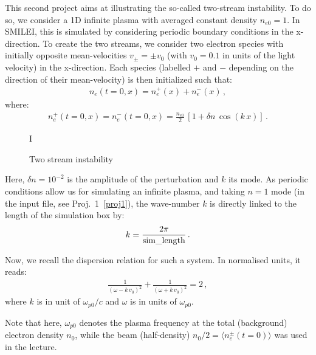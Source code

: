 \documentclass[11pt,a4paper]{article}
\begin{document}
This second project aims at illustrating the so-called two-stream instability.
To do so, we consider a 1D infinite plasma with averaged constant density $n_{e0} = 1$. 
In SMILEI, this is simulated by considering periodic boundary conditions in the x-direction. 
To create the two streams, we consider two electron species with initially opposite mean-velocities $v_{\pm} = \pm v_0$ (with $v_0 = 0.1$ in units of the light velocity) in the x-direction.
Each species (labelled $+$ and $-$ depending on the direction of their mean-velocity) is then initialized such that:
\begin{eqnarray*}
n_e(t=0,x) = n_e^+(x) + n_e^-(x)\,,
\end{eqnarray*}
where:
\begin{eqnarray*}
n_e^+(t=0,x) = n_e^-(t=0,x) = \frac{n_{e0}}{2}\,\left[1 + \delta n\,\cos(k\,x)\right]\,.
\end{eqnarray*}

\begin{wrapfigure}[15]{r}{0.4\textwidth}
\def\svgwidth{\linewidth}

I\caption{Two stream instability}
\label{Fig_2stream}
\end{wrapfigure}

Here, $\delta n = 10^{-2}$ is the amplitude of the perturbation and $k$ its mode.
As periodic conditions allow us for simulating an infinite plasma, and taking $n=1$ mode  (in the input file, see Proj.~1~\ref{proj1}), the wave-number $k$ is directly linked to the length of the simulation box by:
\begin{eqnarray}\label{eq_k}
k = \frac{2\pi}{\rm sim\_length}\,.
\end{eqnarray}


Now, we recall the dispersion relation for such a system. In normalised units, it reads:
\begin{eqnarray}\label{eq_disprel_2stream}
\frac{1}{(\omega - k\,v_0)^2} + \frac{1}{(\omega + k\,v_0)^2} = 2\,,
\end{eqnarray}
where $k$ is in unit of $\omega_{p0}/c$ and $\omega$ is in units of $\omega_{p0}$.


Note that here, $\omega_{p0}$ denotes the plasma frequency at the total (background) electron density $n_0$, while the beam (half-density) $n_0/2 = \langle n_e^{\pm}(t=0) \rangle$ was used in the lecture.
\end{document}
